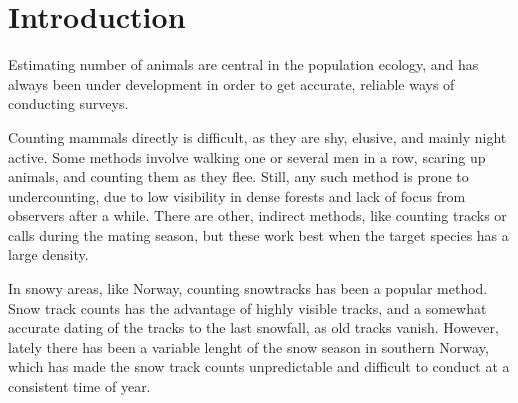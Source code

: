 \chapter{Introduction}



%
%
%
%
Estimating number of animals are central in the population ecology, and has always been under development in order to get accurate, reliable ways of conducting surveys.

Counting mammals directly is difficult, as they are shy, elusive, and mainly night active. Some methods involve walking one or several men in a row, scaring up animals, and counting them as they flee. Still, any such method is prone to undercounting, due to low visibility in dense forests and lack of focus from observers after a while.
There are other, indirect methods, like counting tracks or calls during the mating season, but these work best when the target species has a large density.

In snowy areas, like Norway, counting snowtracks has been a popular method.
Snow track counts has the advantage of highly visible tracks, and a somewhat accurate dating of the tracks to the last snowfall, as old tracks vanish.
However, lately there has been a variable lenght of the snow season in southern Norway, which has made the snow track counts unpredictable and difficult to conduct at a consistent time of year.

